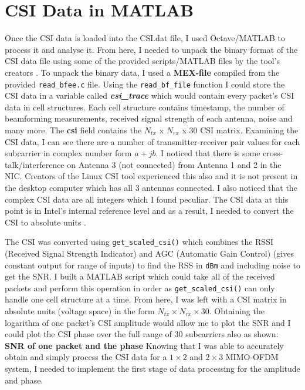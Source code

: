 \section{CSI Data in MATLAB}
Once the CSI data is loaded into the CSI.dat file, I used Octave/MATLAB to process it and analyse it. From here, I needed to unpack the binary format of the CSI data file using some of the provided scripts/MATLAB files by the tool's creators \citep{Halperin_csitool}. To unpack the binary data, I used a \textbf{MEX-file} compiled from the provided \lstinline{read_bfee.c} file. Using the \lstinline{read_bf_file} function I could store the CSI data in a variable called \textbf{\textit{csi\_trace}} which would contain every packet's CSI data in cell structures. Each cell structure contains timestamp, the number of beamforming measurements, received signal strength of each antenna, noise and many more. The \textbf{csi} field contains the $N_{tx}$ x $N_{rx}$ x 30 CSI matrix. Examining the CSI data, I can see there are a number of transmitter-receiver pair values for each subcarrier in complex number form $a + jb$. I noticed that there is some cross-talk/interference on Antenna 3 (not connected) from Antenna 1 and 2 in the NIC. Creators of the Linux CSI tool experienced this also and it is not present in the desktop computer which has all 3 antennas connected. I also noticed that the complex CSI data are all integers which I found peculiar. The CSI data at this point is in Intel's internal reference level and as a result, I needed to convert the CSI to absolute units \citep{Halperin_csitool}. \par
The CSI was converted using \lstinline{get_scaled_csi()} which combines the RSSI (Received Signal Strength Indicator) and AGC (Automatic Gain Control) (gives constant output for range of inputs) to find the RSS in \lstinline{dBm} and including noise to get the SNR. I built a MATLAB script which could take all of the received packets and perform this operation in order as \lstinline{get_scaled_csi()} can only handle one cell structure at a time. From here, I was left with a CSI matrix in absolute units (voltage space) in the form $N_{tx}\times N_{rx}\times30$. Obtaining the logarithm of one packet's CSI amplitude would allow me to plot the SNR and I could plot the CSI phase over the full range of 30 subcarriers also as shown:
\textbf{SNR of one packet and the phase}
Knowing that I was able to accurately obtain and simply process the CSI data for a $1\times 2$ and $2\times 3$ MIMO-OFDM system, I needed to implement the first stage of data processing for the amplitude and phase. 
